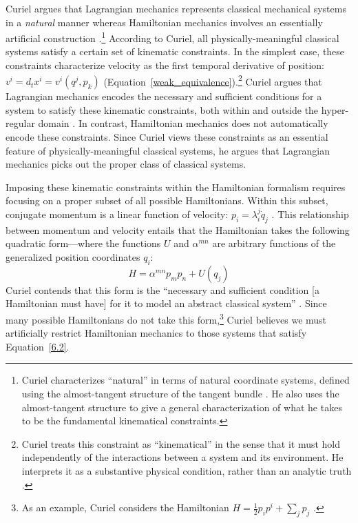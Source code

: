 \documentclass[12pt, twoside]{article}
\begin{document}

Curiel argues that Lagrangian mechanics represents classical mechanical systems in a \textit{natural} manner whereas Hamiltonian mechanics involves an essentially artificial construction \parencites*[270]{Curiel}.\footnote{Curiel characterizes ``natural'' in terms of natural coordinate systems, defined using the almost-tangent structure of the tangent bundle \parencites*[290-291]{Curiel}. He also uses the almost-tangent structure to give a general characterization of what he takes to be the fundamental kinematical constraints.} According to Curiel, all physically-meaningful classical systems satisfy a certain set of kinematic constraints. In the simplest case, these constraints characterize velocity as the first temporal derivative of position: $v^i = d_t x^i = v^i(q^j, p_k)$ (Equation~\ref{weak_equivalence}).\footnote{Curiel treats this constraint as ``kinematical'' in the sense that it must hold independently of the interactions between a system and its environment. He interprets it as a substantive physical condition, rather than an analytic truth \parencites*[282]{Curiel}.} Curiel argues that Lagrangian mechanics encodes the necessary and sufficient conditions for a system to satisfy these kinematic constraints, both within and outside the hyper-regular domain \parencites*[307--308, 311]{Curiel}. In contrast, Hamiltonian mechanics does not automatically encode these constraints. Since Curiel views these constraints as an essential feature of physically-meaningful classical systems, he argues that Lagrangian mechanics picks out the proper class of classical systems. 

Imposing these kinematic constraints within the Hamiltonian formalism requires focusing on a proper subset of all possible Hamiltonians. Within this subset, conjugate momentum is a linear function of velocity: $p_i = \lambda^j_i \dot{q}_j $ \parencites*[304]{Curiel}. This relationship between momentum and velocity entails that the Hamiltonian takes the following quadratic form---where the functions $U$ and $\alpha^{m n}$ are arbitrary functions of the generalized position coordinates $q_i$:
\begin{equation} \label{6.2}
H =\alpha^{m n} p_m p_n + U (q_j) 
\end{equation}
Curiel contends that this form is the ``necessary and sufficient condition [a Hamiltonian must have] for it to model an abstract classical system'' \parencites*[305]{Curiel}. Since many possible Hamiltonians do not take this form,\footnote{As an example, Curiel considers the Hamiltonian $H = \frac{1}{2} p_i p^i + \sum_j p_j$  \parencites*[305]{Curiel}.} Curiel believes we must artificially restrict Hamiltonian mechanics to those systems that satisfy Equation~\ref{6.2}.
\end{document}
